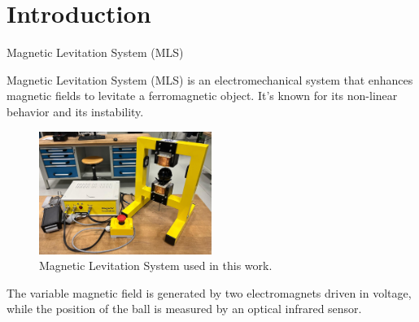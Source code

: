 \section{Introduction}

\begin{frame}{Magnetic Levitation System (MLS)}

    Magnetic Levitation System (MLS) is an electromechanical system that enhances magnetic fields to levitate a ferromagnetic object.
    It's known for its non-linear behavior and its instability.

    \begin{figure}[H]
        \centering
        \includegraphics[width=0.5\textwidth]{./img/Maglev_from_the_lab.jpeg}
        \caption{Magnetic Levitation System used in this work.}
    \end{figure}

    The variable magnetic field is generated by two electromagnets driven in voltage, while the position of the ball is measured by an optical infrared sensor.

\end{frame}



